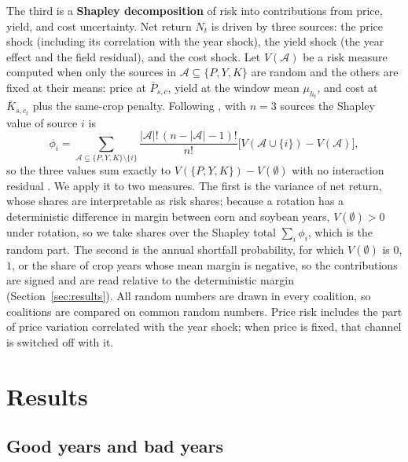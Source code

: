 \documentclass[11pt,letterpaper]{article}
\theoremstyle{remark}
\begin{document}
The third is a \textbf{Shapley decomposition} of risk into contributions from price, yield, and cost uncertainty. Net return $N_t$ is driven by three sources: the price shock (including its correlation with the year shock), the yield shock (the year effect and the field residual), and the cost shock. Let $V(\mathcal A)$ be a risk measure computed when only the sources in $\mathcal A\subseteq\{P,Y,K\}$ are random and the others are fixed at their means: price at $\bar P_{s,c}$, yield at the window mean $\mu_{h_t}$, and cost at $\bar K_{s,c_t}$ plus the same-crop penalty. Following \citet{Shorrocks2013}, with $n=3$ sources the Shapley value of source $i$ is
\begin{equation}
\phi_i = \sum_{\mathcal A\subseteq\{P,Y,K\}\setminus\{i\}} \frac{|\mathcal A|!\,(n-|\mathcal A|-1)!}{n!}\Big[V(\mathcal A\cup\{i\}) - V(\mathcal A)\Big],
\end{equation}
so the three values sum exactly to $V(\{P,Y,K\}) - V(\emptyset)$ with no interaction residual \citep{Shapley1953}. We apply it to two measures. The first is the variance of net return, whose shares are interpretable as risk shares; because a rotation has a deterministic difference in margin between corn and soybean years, $V(\emptyset)>0$ under rotation, so we take shares over the Shapley total $\sum_i\phi_i$, which is the random part. The second is the annual shortfall probability, for which $V(\emptyset)$ is $0$, $1$, or the share of crop years whose mean margin is negative, so the contributions are signed and are read relative to the deterministic margin (Section~\ref{sec:results}). All random numbers are drawn in every coalition, so coalitions are compared on common random numbers. Price risk includes the part of price variation correlated with the year shock; when price is fixed, that channel is switched off with it.

\section{\label{sec:results}Results}

\subsection{Good years and bad years}

\begin{table}[H]
\centering
\caption{Breakeven probability by type of year, medium NCCPI zone (percent): $\Pr(R_t<K_t)$ in a year of the given type. Gap: strict alternation minus continuous corn, percentage points.}
\label{tab:yeartypes}

\end{table}
\end{document}
